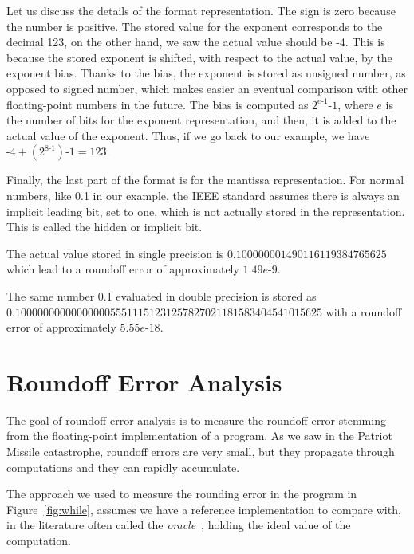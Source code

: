 Let us discuss the details of the format representation.
%
The sign is zero because the number is positive.
%
The stored value for the exponent corresponds to the decimal 123, on the other hand, we saw the actual value should be -4.
%
This is because the stored exponent is shifted, with respect to the actual value, by the exponent bias. 
%
Thanks to the bias, the exponent is stored as unsigned number, as opposed to signed number, which makes easier an eventual comparison with other floating-point numbers in the future.
%
The bias is computed as $2^{e\text{-}1}\text{-}1$, where $e$ is the number of bits for the exponent representation, and then, it is added to the actual value of the exponent.
%
Thus, if we go back to our example, we have $\text{-}4+(2^{8\text{-}1})\text{-}1=123$.
%

Finally, the last part of the format is for the mantissa representation. 
%
For normal numbers, like 0.1 in our example, the IEEE standard assumes there is always an implicit leading bit, set to one, which is not actually stored in the representation.
%
%
This is called the hidden or implicit bit.

%
The actual value stored in single precision is $0.100000001490116119384765625$ which lead to a roundoff error of approximately $1.49e\text{-}9$.
%

The same number 0.1 evaluated in double precision is stored as \\ $0.1000000000000000055511151231257827021181583404541015625$ with a roundoff error of approximately $5.55e\text{-}18$.
%
\section{Roundoff Error Analysis}
%
The goal of roundoff error analysis is to measure the roundoff error stemming from the floating-point implementation of a program.
%
As we saw in the Patriot Missile catastrophe, roundoff errors are very small, but they propagate through computations and they can rapidly accumulate.
%
%
%

The approach we used to measure the rounding error in the program in Figure~\ref{fig:while}, assumes we have a reference implementation to compare with, in the literature often called the \emph{oracle}~\cite{blame}, holding the ideal value of the computation.
%
% 

